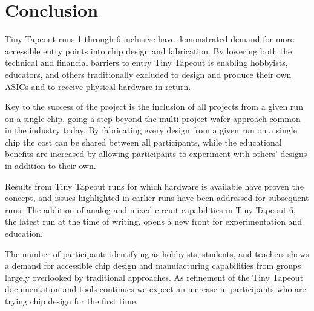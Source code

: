 \section{Conclusion}
\label{sec:conclusion}

Tiny Tapeout runs 1 through 6 inclusive have demonstrated demand for more accessible entry points into chip design and fabrication. By lowering both the technical and financial barriers to entry Tiny Tapeout is enabling hobbyists, educators, and others traditionally excluded to design and produce their own ASICs and to receive physical hardware in return.

Key to the success of the project is the inclusion of all projects from a given run on a single chip, going a step beyond the multi project wafer approach common in the industry today. By fabricating every design from a given run on a single chip the cost can be shared between all participants, while the educational benefits are increased by allowing participants to experiment with others' designs in addition to their own.

Results from Tiny Tapeout runs for which hardware is available have proven the concept, and issues highlighted in earlier runs have been addressed for subsequent runs. The addition of analog and mixed circuit capabilities in Tiny Tapeout 6, the latest run at the time of writing, opens a new front for experimentation and education.

The number of participants identifying as hobbyists, students, and teachers shows a demand for accessible chip design and manufacturing capabilities from groups largely overlooked by traditional approaches. As refinement of the Tiny Tapeout documentation and tools continues we expect an increase in participants who are trying chip design for the first time.
